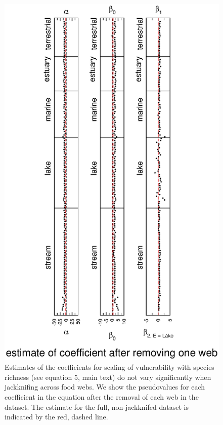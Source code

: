\documentclass[12pt]{article}
\begin{document}
    \begin{figure}[!h]
    \centerline{\includegraphics*[height=.75\textheight]{Figures/Jackknife/Vul_web.eps}}
    \caption{Estimates of the coefficients for scaling of vulnerability with species richness
    (see equation 5, main text) do not vary significantly
    when jackknifing across food webs. We show the pseudovalues for each coefficient
    in the equation after the removal of each web in the dataset.  The estimate for the full, non-jackknifed 
    dataset is indicated by the red, dashed line.}
    \label{Vul_web}
    \end{figure}
\end{document}
